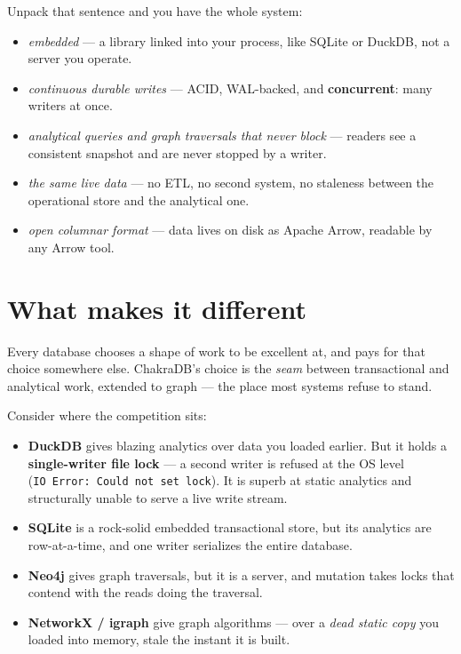\documentclass[
  11pt,
  openany]{book}
\providecommand{\tightlist}{%
  \setlength{\itemsep}{0pt}\setlength{\parskip}{0pt}}
\begin{document}
Unpack that sentence and you have the whole system:

\begin{itemize}
\tightlist
\item
  \emph{embedded} --- a library linked into your process, like SQLite or
  DuckDB, not a server you operate.
\item
  \emph{continuous durable writes} --- ACID, WAL-backed, and
  \textbf{concurrent}: many writers at once.
\item
  \emph{analytical queries and graph traversals that never block} ---
  readers see a consistent snapshot and are never stopped by a writer.
\item
  \emph{the same live data} --- no ETL, no second system, no staleness
  between the operational store and the analytical one.
\item
  \emph{open columnar format} --- data lives on disk as Apache Arrow,
  readable by any Arrow tool.
\end{itemize}

\section{What makes it different}\label{what-makes-it-different}

Every database chooses a shape of work to be excellent at, and pays for
that choice somewhere else. ChakraDB's choice is the \emph{seam} between
transactional and analytical work, extended to graph --- the place most
systems refuse to stand.

Consider where the competition sits:

\begin{itemize}
\tightlist
\item
  \textbf{DuckDB} gives blazing analytics over data you loaded earlier.
  But it holds a \textbf{single-writer file lock} --- a second writer is
  refused at the OS level (\texttt{IO\ Error:\ Could\ not\ set\ lock}).
  It is superb at static analytics and structurally unable to serve a
  live write stream.
\item
  \textbf{SQLite} is a rock-solid embedded transactional store, but its
  analytics are row-at-a-time, and one writer serializes the entire
  database.
\item
  \textbf{Neo4j} gives graph traversals, but it is a server, and
  mutation takes locks that contend with the reads doing the traversal.
\item
  \textbf{NetworkX / igraph} give graph algorithms --- over a \emph{dead
  static copy} you loaded into memory, stale the instant it is built.
\end{itemize}
\end{document}
